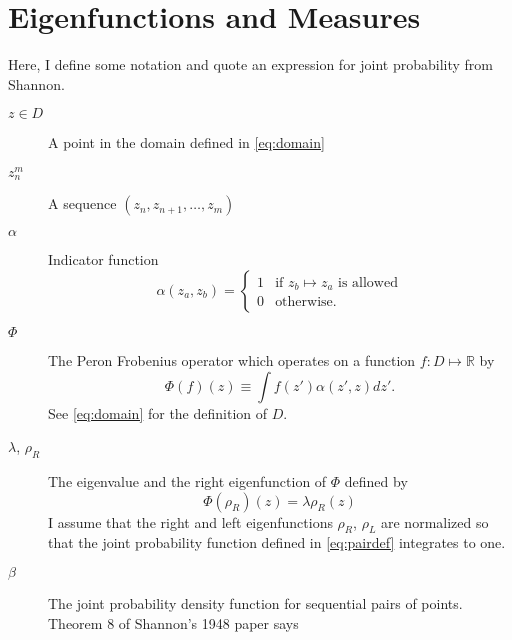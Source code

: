 \documentclass[twocolumn]{article}
\newcommand{\field}[1]{\mathbb{#1}}
\newcommand\REAL{\field{R}}
\begin{document}
\section{Eigenfunctions and Measures}
\label{sec:eigenfunctions}

Here, I define some notation and quote an expression for joint
probability from Shannon.%
\newcommand{\tuple}[2]{z_{#1}^{#2}}%
\newcommand{\allowed}{\alpha}%
\newcommand{\preimage}{\tau}%
\newcommand{\scale}[1]{\psi_{#1}}%
\newcommand{\stationary}{\mu}%
\newcommand{\pair}{\beta}%
\newcommand{\ptuple}[1]{\gamma_{#1}}%
\newcommand{\Skip}[1]{\delta_{#1}}%
\newcommand{\PFop}{\Phi} %
\newcommand{\lefunc}{\rho_L}%
\newcommand{\refunc}{\rho_R}%
\newcommand{\eval}{\lambda}
\newcommand{\supn}{^{[n]}}
\newcommand{\suptwo}{^{[2]}}
\begin{description}
\item[$z\in D$] A point in the domain defined in \eqref{eq:domain}
\item[$\tuple{n}{m}$] A sequence $(z_n, z_{n+1}, \ldots, z_m)$
\item[$\allowed$] Indicator function
  \begin{equation*}
    \allowed(z_a,z_b) =
    \begin{cases}
      1 & \text{if }z_b \mapsto z_a \text{ is allowed}\\
      0 & \text{otherwise}.
    \end{cases}
  \end{equation*}
\item[$\PFop$] The Peron Frobenius operator which operates on a
  function $f:D\mapsto \REAL$ by 
  \begin{equation*}
    \PFop(f)(z) \equiv \int f(z') \allowed(z',z) dz'.
  \end{equation*}
  See \eqref{eq:domain} for the definition of $D$. 
\item[$\eval$, $\refunc$] The eigenvalue and the right eigenfunction
  of $\PFop$ defined by
  \begin{equation*}
    \PFop(\refunc)(z) = \eval \refunc(z)
  \end{equation*}
  I assume that the right and left eigenfunctions $\refunc$, $\lefunc$
  are normalized so that the joint probability function defined in
  \eqref{eq:pairdef} integrates to one.
\item[$\pair$] The joint probability density function for sequential
  pairs of points.  Theorem 8 of Shannon's 1948 paper says
  \begin{equation}

\end{equation}
\end{description}
\end{document}
